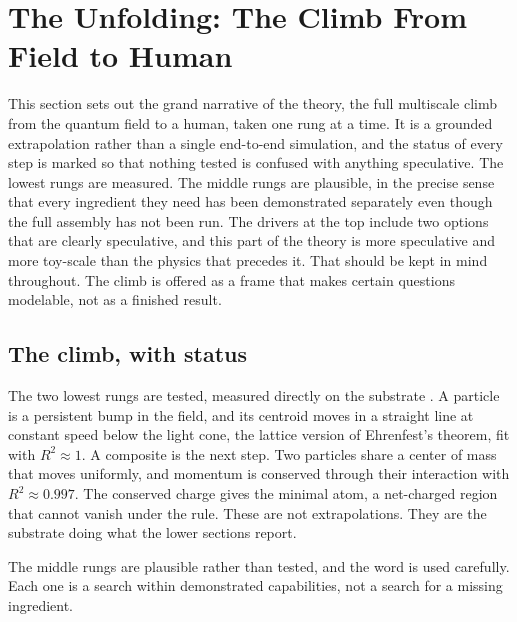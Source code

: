 \section{The Unfolding: The Climb From Field to Human}

This section sets out the grand narrative of the theory, the full multiscale climb from the quantum field to a
human, taken one rung at a time. It is a grounded extrapolation rather than a single end-to-end simulation, and
the status of every step is marked so that nothing tested is confused with anything speculative. The lowest rungs
are measured. The middle rungs are plausible, in the precise sense that every ingredient they need has been
demonstrated separately even though the full assembly has not been run. The drivers at the top include two options
that are clearly speculative, and this part of the theory is more speculative and more toy-scale than the physics
that precedes it. That should be kept in mind throughout. The climb is offered as a frame that makes certain
questions modelable, not as a finished result.

\subsection{The climb, with status}

The two lowest rungs are tested, measured directly on the substrate \cite{pollard2026vibetest}. A particle is a
persistent bump in the field, and its centroid moves in a straight line at constant speed below the light cone,
the lattice version of Ehrenfest's theorem, fit with $R^2 \approx 1$. A composite is the next step. Two particles
share a center of mass that moves uniformly, and momentum is conserved through their interaction with $R^2 \approx
0.997$. The conserved charge gives the minimal atom, a net-charged region that cannot vanish under the rule. These
are not extrapolations. They are the substrate doing what the lower sections report.

The middle rungs are plausible rather than tested, and the word is used carefully. Each one is a search within
demonstrated capabilities, not a search for a missing ingredient.

